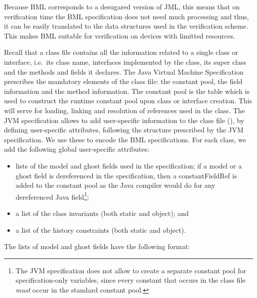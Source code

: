 \begin{itemize}

      Because BML corresponds to a desugared version of JML, this
      means that on verification time the BML specification does not
      need much processing and thus, it can be easily translated to
      the data structures used in the verification scheme. This makes
      BML suitable for verification on devices with limitted
      resources.
      
\end{itemize}


Recall that a class file contains all the information related to a
single class or interface, i.e.~its class name, interfaces
implemented by the class, its super class and the methods and fields
it declares. The Java Virtual Machine Specification~\cite{JVMspec} 
prescribes the mandatory elements of the class
file: the constant pool, the field information and the method
information. The constant pool is the table which is used to construct
the runtime constant pool upon class or interface creation. This will
serve for loading, linking and resolution of references used in the
class. The JVM specification allows to add user-specific information to the 
class
file (\cite[\S4.7.1]{JVMspec}), by defining user-specific attributes,
following the structure prescribed by the JVM specification. 
We use these to encode
the BML specifications. For each class, we add the following global
user-specific attributes:
\begin{itemize}
\item lists of the model and ghost fields used in the specification;
if a model or a ghost field is dereferenced in the specification, then
a constantFieldRef is added to the constant pool as the Java compiler
would do for any dereferenced Java field\footnote{The JVM
specification does not
allow to create a separate constant pool for specification-only
variables, since every constant that occurs in the class file
\emph{must} occur in the standard constant pool.};
\item a list of the class invariants (both static and object); and
\item a list of the history constraints (both static and object).
\end{itemize}

The lists of model and ghost fields have the following format:\\ 

